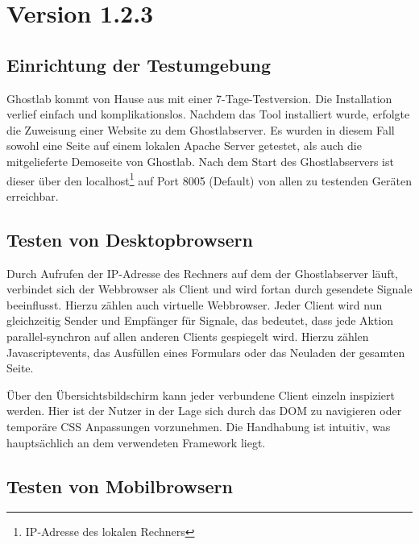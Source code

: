 	\section{ Version 1.2.3}
		\subsection {Einrichtung der Testumgebung}
		Ghostlab kommt von Hause aus mit einer 7-Tage-Testversion. Die Installation verlief einfach und komplikationslos. Nachdem das Tool installiert wurde, erfolgte die Zuweisung einer Website zu dem Ghostlabserver. Es wurden in diesem Fall sowohl eine Seite auf einem lokalen \Gls{Apache} Server getestet, als auch die mitgelieferte Demoseite von Ghostlab. Nach dem Start des Ghostlabservers ist dieser über den localhost\footnote{IP-Adresse des lokalen Rechners} auf Port 8005 (Default) von allen zu testenden Geräten erreichbar.
		
		\subsection{Testen von Desktopbrowsern}
		Durch Aufrufen der IP-Adresse des Rechners auf dem der Ghostlabserver läuft, verbindet sich der \Gls{Webbrowser} als Client und wird fortan durch gesendete Signale beeinflusst. Hierzu zählen auch virtuelle \Gls{Webbrowser}. Jeder Client wird nun gleichzeitig Sender und Empfänger für Signale, das bedeutet, dass jede Aktion \gls{parallel-synchron} auf allen anderen Clients gespiegelt wird. Hierzu zählen \Gls{Javascript}events, das Ausfüllen eines Formulars oder das Neuladen der gesamten Seite.
		
		Über den Übersichtsbildschirm kann jeder verbundene Client einzeln inspiziert werden. Hier ist der Nutzer in der Lage sich durch das \Gls{DOM} zu navigieren oder temporäre CSS Anpassungen vorzunehmen. Die Handhabung ist intuitiv, was hauptsächlich an dem verwendeten \Gls{Framework}  liegt.
		
		\pagebreak
		\subsection{Testen von Mobilbrowsern}
		
